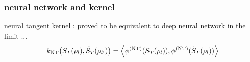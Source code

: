 
\subsubsection{neural network and kernel}
\begin{definition}\label{def:neural_tangent_kernel}
	neural tangent kernel \cite{jacotNeuralTangentKernel2020}: proved to be equivalent to deep neural network \cite{gaoEfficientRepresentationQuantum2017} in the limit ...
	\begin{equation}
		k_{\textup{NT}} \qty(S_T(\rho_l),\tilde{S}_T(\rho_{l'}))
		=
		\expval{
			\phi^{(\textup{NT})}(S_T(\rho_l)),
			\phi^{(\textup{NT})}(\tilde{S}_T(\rho_l))
		}
	\end{equation}
\end{definition}



